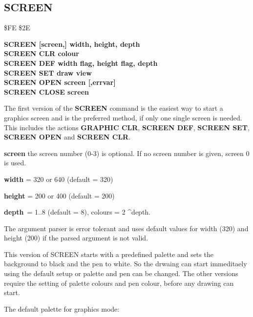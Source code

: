 \subsection{SCREEN}
\begin{description}[leftmargin=2cm,style=nextline]
\item [Token:] \$FE \$2E
\item [Format:] {\bf SCREEN [screen,] width, height, depth} \\
                {\bf SCREEN CLR colour} \\
                {\bf SCREEN DEF width flag, height flag, depth} \\
                {\bf SCREEN SET draw view} \\
                {\bf SCREEN OPEN screen [,errvar]} \\
                {\bf SCREEN CLOSE screen}

\item [Usage:] The first version of the {\bf SCREEN} command is the easiest
               way to start a graphics screen and is the preferred
               method, if only one single screen is needed. This includes
               the actions {\bf GRAPHIC CLR}, {\bf SCREEN DEF},
               {\bf SCREEN SET}, {\bf SCREEN OPEN} and {\bf SCREEN CLR}.

               {\bf screen} the screen number (0-3) is optional.
               If no screen number is given, screen 0 is used.

               {\bf width} = 320 or 640 (default = 320)

               {\bf height} = 200 or 400 (default = 200)

               {\bf depth} = 1..8 (default = 8),
               colours = 2 \textasciicircum depth.

               The argument parser is error tolerant and uses default values
               for width (320) and height (200)
               if the parsed argument is not valid.

               This version of SCREEN starts with a predefined
               palette and sets the background to black and the pen to white.
               So the drwaing can start immeditaely using the default setup
               or palette and pen can be changed. The other versions
               require the setting of palette colours and pen colour,
               before any drawing can start.

               The default palette for graphics mode:


\end{description}
